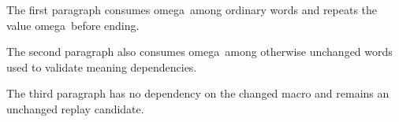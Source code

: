 
\hsize=220pt \vsize=240pt
\def\variant{omega}
The first paragraph consumes \variant\ among ordinary words and repeats the value \variant\ before ending.

The second paragraph also consumes \variant\ among otherwise unchanged words used to validate meaning dependencies.

The third paragraph has no dependency on the changed macro and remains an unchanged replay candidate.
\bye

